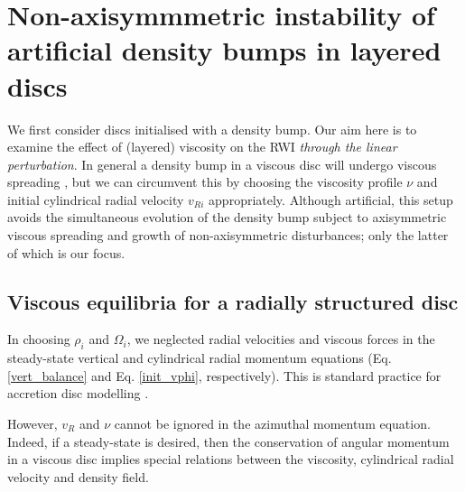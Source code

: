 \section{Non-axisymmmetric instability of artificial density bumps in
  layered discs}\label{density_bump} 
We first consider discs initialised with a density bump. Our aim here
is to examine the effect of (layered) viscosity on the RWI 
\emph{through the linear perturbation}. 
In general a density bump in a viscous disc will undergo viscous
spreading \citep{lyndenbell74}, but we can circumvent this 
by choosing the viscosity profile $\nu$ and initial cylindrical radial
velocity $v_{Ri}$ appropriately. 
Although artificial, this setup avoids 
the simultaneous evolution of the density bump subject to
axisymmetric viscous spreading and growth of
non-axisymmetric disturbances; only the latter of which is our focus. 


\subsection{Viscous equilibria for a radially structured
  disc}\label{visc_eq} 
 
In choosing $\rho_i$ and $\Omega_i$, we neglected radial
velocities and viscous forces in the steady-state vertical and
cylindrical radial momentum equations (Eq. \ref{vert_balance} and
Eq. \ref{init_vphi}, respectively). This is standard practice for
accretion disc modelling \citep[e.g.][]{takeuchi02}.   

However, $v_{R}$ and $\nu$ cannot be ignored in the azimuthal
momentum equation. Indeed, if a steady-state is desired, then the
conservation of angular momentum in a viscous disc implies special
relations between the viscosity, cylindrical radial velocity and
density field. %


